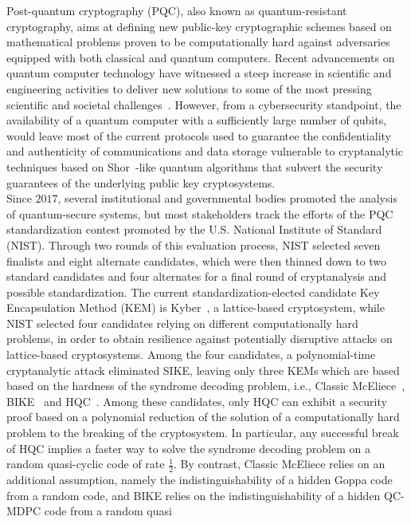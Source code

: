 Post-quantum cryptography (PQC), also known as quantum-resistant 
cryptography, aims at defining new public-key cryptographic schemes based 
on mathematical problems proven to be computationally hard against 
adversaries equipped with both classical and quantum computers. 
Recent advancements on quantum computer technology have witnessed a steep 
increase in scientific and engineering activities to deliver new solutions 
to some of the most pressing scientific and societal challenges~\cite{mckinsey23}. 
However, from a cybersecurity standpoint, the availability of a quantum computer 
with a sufficiently large number of qubits, would leave most of the 
current protocols used to guarantee the confidentiality and authenticity of communications and data storage vulnerable to cryptanalytic techniques based on Shor~\cite{DBLP:conf/focs/Shor94}-like quantum algorithms that subvert the 
security guarantees of the underlying public key cryptosystems.\\
\indent Since $2017$, several institutional and governmental bodies promoted the 
analysis of quantum-secure systems, but most stakeholders track the efforts 
of the PQC standardization contest promoted by the U.S. National Institute 
of Standard (NIST).  
Through two rounds of this evaluation process, NIST selected seven finalists
and eight alternate candidates, which were then thinned down to two standard
candidates and four alternates for a final round of cryptanalysis and possible 
standardization. 
The current standardization-elected candidate Key Encapsulation Method (KEM) is 
Kyber~\cite{Kyber}, a lattice-based cryptosystem, while NIST selected four 
candidates relying on different computationally hard problems, in order to obtain
resilience against potentially disruptive attacks on lattice-based cryptosystems.
Among the four candidates, a polynomial-time cryptanalytic attack eliminated
SIKE, leaving only three KEMs which are based based on the hardness of the 
syndrome decoding problem, i.e., Classic McEliece~\cite{ClassicMcEliece}, 
BIKE~\cite{BIKE} and HQC~\cite{HQC}.
Among these candidates, only HQC can exhibit a security proof 
based on a polynomial reduction of the solution of a computationally
hard problem to the breaking of the cryptosystem.
In particular, any successful break of HQC implies a faster way to solve the
syndrome decoding problem on a random quasi-cyclic code of rate $\frac{1}{2}$.
By contrast, Classic McEliece relies on an additional assumption, namely the indistinguishability of a hidden Goppa code from a random code, and BIKE relies 
on the indistinguishability of a hidden QC-MDPC code from a random quasi 
